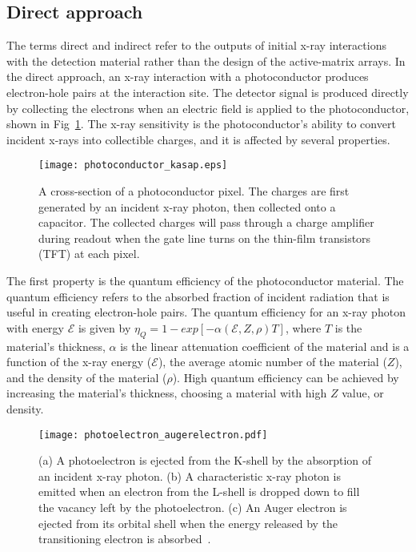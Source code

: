 \subsection{Direct approach}
The terms direct and indirect refer to the outputs of initial x-ray interactions with the detection material rather than the design of the active-matrix arrays.  In the direct approach, an x-ray interaction with a photoconductor produces electron-hole pairs at the interaction site.  The detector signal is produced directly by collecting the electrons when an electric field is applied to the photoconductor, shown in Fig~\ref{fig:photoconductor_cross_section}.  The x-ray sensitivity is the photoconductor's ability to convert incident x-rays into collectible charges, and it is affected by several properties.

%
\begin{figure}[ht]
\centering
\texttt{[image: photoconductor\_kasap.eps]}
\caption[]{A cross-section of a photoconductor pixel\footnotemark.  The charges are first generated by an incident x-ray photon, then collected onto a capacitor.  The collected charges will pass through a charge amplifier during readout when the gate line turns on the thin-film transistors (TFT) at each pixel.}
\label{fig:photoconductor_cross_section}
\end{figure}



The first property is the quantum efficiency of the photoconductor material.  The quantum efficiency refers to the absorbed fraction of incident radiation that is useful in creating electron-hole pairs.  The quantum efficiency for an x-ray photon with energy $\mathcal{E}$ is given by $\eta_Q = 1 - exp[-\alpha (\mathcal{E}, Z, \rho) T]$, where $T$ is the material's thickness, $\alpha$ is the linear attenuation coefficient of the material and is a function of the x-ray energy ($\mathcal{E}$), the average atomic number of the material ($Z$), and the density of the material ($\rho$).  High quantum efficiency can be achieved by increasing the material's thickness, choosing a material with high $Z$ value, or density.  

\begin{figure}
\texttt{[image: photoelectron\_augerelectron.pdf]}
\caption{(a) A photoelectron is ejected from the K-shell by the absorption of an incident x-ray photon. (b) A characteristic x-ray photon is emitted when an electron from the L-shell is dropped down to fill the vacancy left by the photoelectron. (c) An Auger electron is ejected from its orbital shell when the energy released by the transitioning electron is absorbed~\citep{wiki_photoelectric}.}
\label{fig:photoelectric}
\end{figure}

